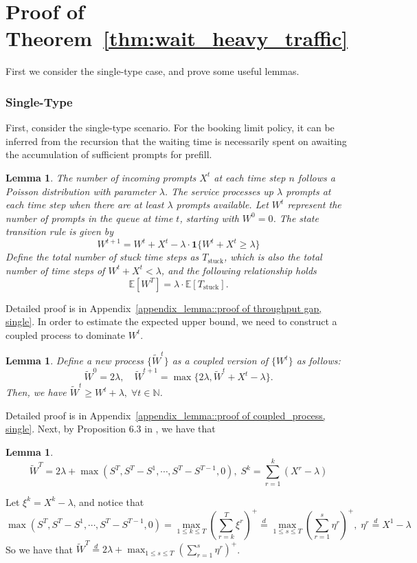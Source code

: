 \documentclass[preprint]{article}
\theoremstyle{plain}
\newtheorem{lemma}[theorem]{Lemma}
\theoremstyle{definition}
\theoremstyle{remark}
\begin{document}
\section{Proof of Theorem~\ref{thm:wait_heavy_traffic}}\label{appexidx::proof of wait_heavy_traffic}
First we consider the single-type case, and prove some useful lemmas.
\subsubsection{Single-Type}

First, consider the single-type scenario. For the booking limit policy, it can be inferred from the recursion that the waiting time is necessarily spent on awaiting the accumulation of sufficient prompts for prefill.
\begin{lemma}\label{lemma::throughput gap, single}
The number of incoming prompts $X^t$ at each time step $n$ follows a Poisson distribution with parameter $\lambda$. The service processes up $\lambda$ prompts at each time step when there are at least $\lambda$ prompts available. Let $W^t$ represent the number of prompts in the queue at time $t$, starting with $W^0=0$. The state transition rule is given by
$$W^{t+1}=W^t+X^t-\lambda\cdot \mathbf{1}\{W^t+X^t\geq \lambda\}$$
Define the total number of stuck time steps as $T_{\text{stuck}}$, which is also the total number of time steps of $W^t+X^t<\lambda$, and the following relationship holds
$$\mathbb{E}[W^T]= \lambda\cdot\mathbb{E}[T_{\text{stuck}}].$$
\end{lemma}
Detailed proof is in Appendix~\ref{appendix_lemma::proof of throughput gap, single}. In order to estimate the expected upper bound, we need to construct a coupled process to dominate $W^t$.

\begin{lemma}\label{lem:coupled_process, single}
Define a new process $\{\tilde{W}^t\}$ as a coupled version of $\{W^t\}$ as follows:
$$
\tilde{W}^0 = 2\lambda, \quad \tilde{W}^{t+1} = \max\{ 2\lambda, \tilde{W}^t + X^t - \lambda \}.
$$
Then, we have $\tilde{W}^t \geq W^t + \lambda, \;\forall t\in \mathbb{N}$.
\end{lemma}
Detailed proof is in Appendix~\ref{appendix_lemma::proof of coupled_process, single}. Next, by Proposition 6.3 in \cite{asmussen2003applied}, we have that 
\begin{lemma}
    $$\tilde{W}^T=2\lambda+\max(S^T, S^T-S^1,\cdots,S^T-S^{T-1},0),\; S^k=\sum_{r=1}^k (X^r-\lambda) $$
\end{lemma}
Let $\xi^k = X^k-\lambda$, and notice that 
$$\max(S^T, S^T-S^1,\cdots,S^T-S^{T-1},0)=\max_{1\leq k\leq T}(\sum_{r=k}^{T}\xi^r)^+\overset{d}{=}\max_{1\leq s\leq T}(\sum_{r=1}^{s}\eta^r)^+, \; \eta^r\overset{d}{=}X^1-\lambda$$
So we have that $\tilde{W}^T \overset{d}{=}2\lambda+\max_{1\leq s\leq T}(\sum_{r=1}^{s}\eta^r)^+ $. 
\end{document}

